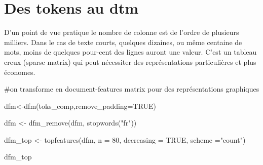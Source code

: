 \documentclass[
  letterpaper,
  DIV=11,
  numbers=noendperiod]{scrreprt}
\newenvironment{Shaded}{\begin{snugshade}}{\end{snugshade}}
\newcommand{\AttributeTok}[1]{\textcolor[rgb]{0.40,0.45,0.13}{#1}}
\newcommand{\CommentTok}[1]{\textcolor[rgb]{0.37,0.37,0.37}{#1}}
\newcommand{\ConstantTok}[1]{\textcolor[rgb]{0.56,0.35,0.01}{#1}}
\newcommand{\DecValTok}[1]{\textcolor[rgb]{0.68,0.00,0.00}{#1}}
\newcommand{\FunctionTok}[1]{\textcolor[rgb]{0.28,0.35,0.67}{#1}}
\newcommand{\NormalTok}[1]{\textcolor[rgb]{0.00,0.23,0.31}{#1}}
\newcommand{\OtherTok}[1]{\textcolor[rgb]{0.00,0.23,0.31}{#1}}
\newcommand{\StringTok}[1]{\textcolor[rgb]{0.13,0.47,0.30}{#1}}
\begin{document}
\section{Des tokens au dtm}\label{des-tokens-au-dtm}

D'un point de vue pratique le nombre de colonne est de l'ordre de
plusieurs milliers. Dans le cas de texte courts, quelques dizaines, ou
même centaine de mots, moins de quelques pour-cent des lignes auront une
valeur. C'est un tableau creux (sparse matrix) qui peut nécessiter des
représentations particulières et plus économes.

\begin{Shaded}
\begin{Highlighting}[]
\CommentTok{\#on transforme en document{-}features matrix pour des représentations graphiques }

\NormalTok{dfm}\OtherTok{\textless{}{-}}\FunctionTok{dfm}\NormalTok{(toks\_comp,}\AttributeTok{remove\_padding=}\ConstantTok{TRUE}\NormalTok{) }

\NormalTok{dfm }\OtherTok{\textless{}{-}} \FunctionTok{dfm\_remove}\NormalTok{(dfm, }\FunctionTok{stopwords}\NormalTok{(}\StringTok{"fr"}\NormalTok{))}

\NormalTok{dfm\_top }\OtherTok{\textless{}{-}} \FunctionTok{topfeatures}\NormalTok{(dfm, }\AttributeTok{n =} \DecValTok{80}\NormalTok{, }\AttributeTok{decreasing =} \ConstantTok{TRUE}\NormalTok{,  }\AttributeTok{scheme =}\StringTok{"count"}\NormalTok{)}

\NormalTok{dfm\_top}
\end{Highlighting}
\end{Shaded}
\end{document}
